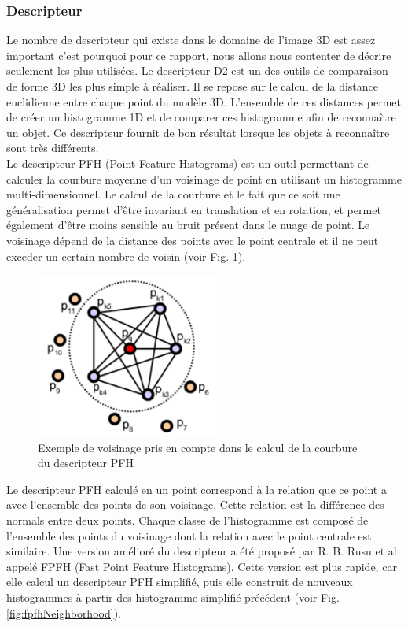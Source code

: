 \subsubsection{Descripteur}
\label{descriptor}
Le nombre de descripteur qui existe dans le domaine de l'image 3D est assez important c'est pourquoi pour ce rapport,
nous allons nous contenter de décrire seulement les plus utilisées. Le descripteur D2\cite{D2} est un des outils de 
comparaison de forme 3D les plus simple à réaliser. Il se repose sur le calcul de la distance euclidienne entre 
chaque point du modèle 3D. L'ensemble de ces distances permet de créer un histogramme 1D et de comparer ces histogramme
afin de reconnaître un objet. Ce descripteur fournit de bon résultat lorsque les objets à reconnaître sont très 
différents.\\

Le descripteur PFH\cite{PFH} (Point Feature Histograms) est un outil permettant de calculer la courbure moyenne d'un voisinage de point en utilisant un histogramme multi-dimensionnel. Le calcul de la courbure et le fait que ce soit une généralisation permet d'être invariant 
en translation et en rotation, et permet également d'être moins sensible au bruit présent dans le nuage de point. Le voisinage 
dépend de la distance des points avec le point centrale et il ne peut exceder un certain nombre de voisin 
(voir Fig. \ref{fig:pfhNeighborhood}).\\

\begin{figure}[!h]
  \begin{center}
    \includegraphics[width=6cm]{image/PFH.png}
    \caption{Exemple de voisinage pris en compte dans le calcul de la courbure du descripteur PFH}
    \label{fig:pfhNeighborhood}
  \end{center}
\end{figure}

Le descripteur PFH calculé en un point correspond à la relation que ce point a avec l'ensemble des points de son voisinage. Cette relation
est la différence des normals entre deux points. Chaque classe de l'histogramme est composé de l'ensemble des points du voisinage dont 
la relation avec le point centrale est similaire. Une version amélioré du descripteur a été proposé par R. B. Rusu et al\cite{FPFH} appelé
FPFH (Fast Point Feature Histograms). Cette version est plus rapide, car elle calcul un descripteur PFH simplifié, puis elle construit
de nouveaux histogrammes à partir des histogramme simplifié précédent (voir Fig. \ref{fig:fpfhNeighborhood}).\\

